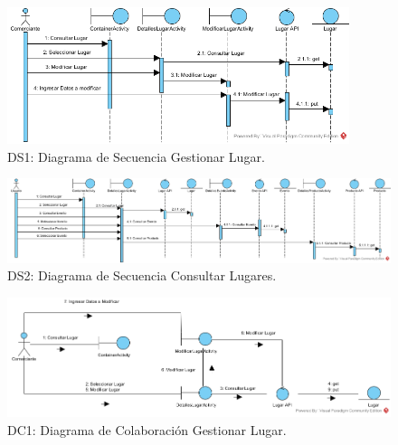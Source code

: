\documentclass[12pt,letterpaper,openany]{book}
\begin{document}
\begin{figure}[H]
\begin{center}
\includegraphics[width=10cm]{./imagenes/DS/DS_gestionar_lugar}
\caption{DS1: Diagrama de Secuencia Gestionar Lugar.}
\end{center}
\end{figure}

\begin{figure}[H]
\begin{center}
\includegraphics[width=14cm]{./imagenes/DS/DS_consultar_lugares}
\caption{DS2: Diagrama de Secuencia Consultar Lugares.}
\end{center}
\end{figure}



\begin{figure}[H]
\begin{center}
\includegraphics[width=14cm]{./imagenes/DC/DC_gestionar_lugar}
\caption{DC1: Diagrama de Colaboración Gestionar Lugar.}
\end{center}
\end{figure}
\end{document}

